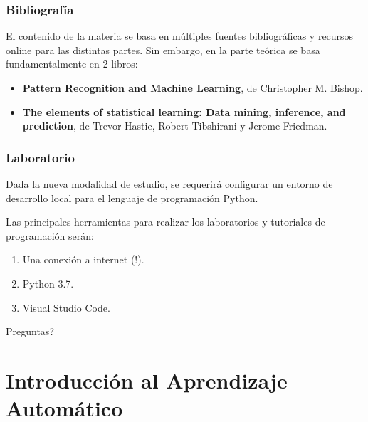 \documentclass[10pt]{beamer}
\begin{document}
\begin{frame}
    \frametitle{Bibliografía}
    El contenido de la materia se basa en múltiples fuentes bibliográficas y recursos online 
    para las distintas partes. Sin embargo, en la parte teórica se basa fundamentalmente en 2 libros:

    \begin{itemize}
        \item \textbf{Pattern Recognition and Machine Learning}, de Christopher M. Bishop.
        \item \textbf{The elements of statistical learning: Data mining, inference, and prediction}, de Trevor Hastie, Robert Tibshirani y Jerome Friedman.
    \end{itemize}

\end{frame}


\begin{frame}

    \frametitle{Laboratorio}
    Dada la nueva modalidad de estudio, se requerirá configurar un entorno de desarrollo
    local para el lenguaje de programación Python.

    Las principales herramientas para realizar los laboratorios y tutoriales de 
    programación serán:

    \begin{enumerate}
        \item Una conexión a internet (!).
        \item Python 3.7.
        \item Visual Studio Code.
    \end{enumerate}

\end{frame}

{
\begin{frame}[standout]
  Preguntas?
\end{frame}
}

\section{Introducción al Aprendizaje Automático}
\end{document}
